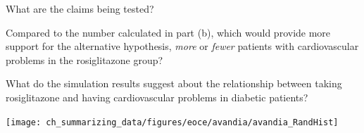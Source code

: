 {\begin{parts}
\begin{subparts}
\item What are the claims being tested?
\item Compared to the number calculated in part (b), which would provide more support for the alternative hypothesis,  \textit{more} or \textit{fewer} patients with cardiovascular problems in the rosiglitazone group?
\item What do the simulation results suggest about the relationship between taking rosiglitazone and having cardiovascular problems in diabetic patients?
\end{subparts}
\begin{center}
\texttt{[image: ch\_summarizing\_data/figures/eoce/avandia/avandia\_RandHist]} \\
\end{center}
\end{parts}
}{}

\textA{\newpage}


